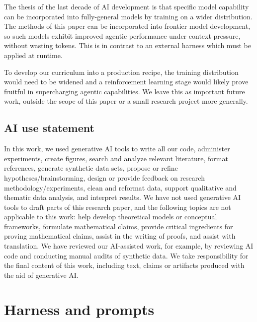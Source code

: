 \documentclass{article} %
\begin{document}
The thesis of the last decade of AI development is that specific model capability can be incorporated into fully-general models by training on a wider distribution. The methods of this paper can be incorporated into frontier model development, so such models exhibit improved agentic performance under context pressure, without wasting tokens. This is in contrast to an external harness which must be applied at runtime.

To develop our curriculum into a production recipe, the training distribution would need to be widened and a reinforcement learning stage would likely prove fruitful in supercharging agentic capabilities. We leave this as important future work, outside the scope of this paper or a small research project more generally.

\subsection*{AI use statement}

In this work, we used generative AI tools to write all our code, administer experiments, create figures, search and analyze relevant literature, format references, generate synthetic data sets, propose or refine hypotheses/brainstorming, design or provide feedback on research methodology/experiments, clean and reformat data, support qualitative and thematic data analysis, and interpret results. We have not used generative AI tools to draft parts of this research paper, and the following topics are not applicable to this work: help develop theoretical models or conceptual frameworks, formulate mathematical claims, provide critical ingredients for proving mathematical claims, assist in the writing of proofs, and assist with translation. We have reviewed our AI-assisted work, for example, by reviewing AI code and conducting manual audits of synthetic data. We take responsibility for the final content of this work,
including text, claims or artifacts produced with the aid of generative AI.




\raggedbottom   %



\pagebreak

\clearpage
\appendix
\section{Harness and prompts}
\label{app:harness}
\end{document}
